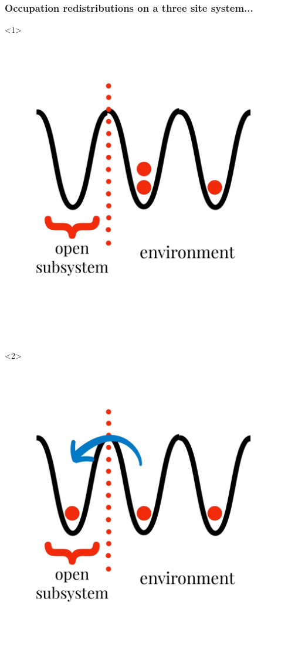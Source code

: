 \documentclass[aspectratio=169]{beamer}
\begin{document}
\begin{frame}
  \frametitle{Occupation redistributions on a three site system...}
  \begin{onlyenv}<1>
    \begin{center}
      \includegraphics[scale=0.17]{../img/constraints.jpeg}
    \end{center}
  \end{onlyenv}
  \begin{onlyenv}<2>
    \begin{center}
      \includegraphics[scale=0.17]{../img/constraints2.jpeg}

\end{center}
\end{onlyenv}
\end{frame}
\end{document}
